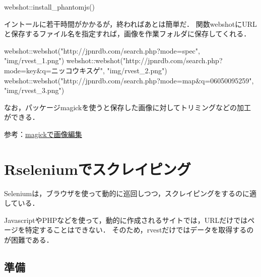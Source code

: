 \documentclass[
]{article}
\newenvironment{Shaded}{\begin{snugshade}}{\end{snugshade}}
\newcommand{\FunctionTok}[1]{\textcolor[rgb]{0.00,0.00,0.00}{#1}}
\newcommand{\NormalTok}[1]{#1}
\newcommand{\SpecialCharTok}[1]{\textcolor[rgb]{0.00,0.00,0.00}{#1}}
\newcommand{\StringTok}[1]{\textcolor[rgb]{0.31,0.60,0.02}{#1}}
\begin{document}
\begin{Shaded}
\begin{Highlighting}[]
\NormalTok{webshot}\SpecialCharTok{::}\FunctionTok{install\_phantomjs}\NormalTok{()}
\end{Highlighting}
\end{Shaded}

イントールに若干時間がかかるが，終わればあとは簡単だ．
関数webshotにURLと保存するファイル名を指定すれば，画像を作業フォルダに保存してくれる．

\begin{Shaded}
\begin{Highlighting}[]
\NormalTok{webshot}\SpecialCharTok{::}\FunctionTok{webshot}\NormalTok{(}\StringTok{"http://jpnrdb.com/search.php?mode=spec"}\NormalTok{, }\StringTok{"img/rvest\_1.png"}\NormalTok{)}
\NormalTok{webshot}\SpecialCharTok{::}\FunctionTok{webshot}\NormalTok{(}\StringTok{"http://jpnrdb.com/search.php?mode=key\&q=ニッコウキスゲ"}\NormalTok{, }\StringTok{"img/rvest\_2.png"}\NormalTok{)}
\NormalTok{webshot}\SpecialCharTok{::}\FunctionTok{webshot}\NormalTok{(}\StringTok{"http://jpnrdb.com/search.php?mode=map\&q=06050095259"}\NormalTok{, }\StringTok{"img/rvest\_3.png"}\NormalTok{)}
\end{Highlighting}
\end{Shaded}

なお，パッケージmagickを使うと保存した画像に対してトリミングなどの加工ができる．

参考：\protect\hyperlink{magick}{magickで画像編集}

\hypertarget{rselenium}{%
\section{Rseleniumでスクレイピング}\label{rselenium}}

Seleniumは，ブラウザを使って動的に巡回しつつ，スクレイピングをするのに適している．

JavascriptやPHPなどを使って，動的に作成されるサイトでは，URLだけではページを特定することはできない．
そのため，rvestだけではデータを取得するのが困難である．

\hypertarget{ux6e96ux5099-11}{%
\subsection{準備}\label{ux6e96ux5099-11}}
\end{document}
